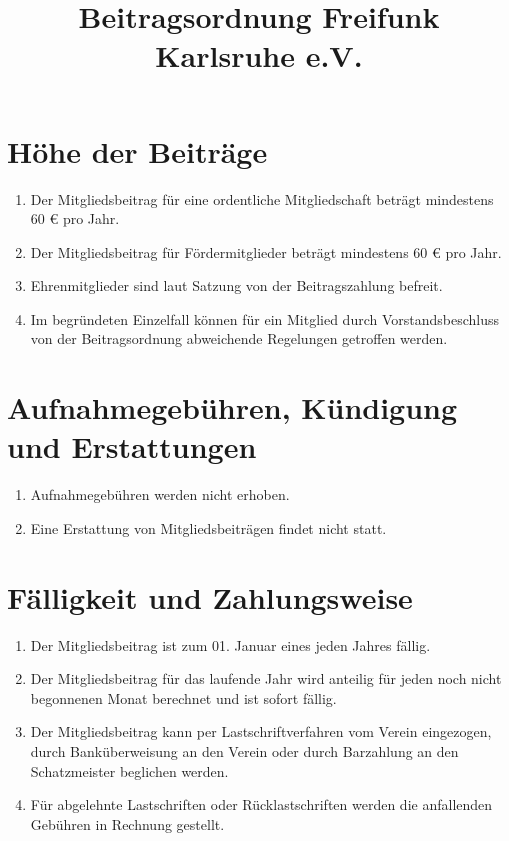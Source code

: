 \documentclass[12pt,a4paper,titlepage]{scrartcl}
\title{Beitragsordnung Freifunk Karlsruhe e.V.}
\begin{document}
\maketitle
{}
\thispagestyle{empty}
\newpage
{}
\setcounter{page}{1}

\section{Höhe der Beiträge}
\begin{enumerate}
\item Der Mitgliedsbeitrag für eine ordentliche Mitgliedschaft beträgt mindestens 60 € pro Jahr.
\item Der Mitgliedsbeitrag für Fördermitglieder beträgt mindestens 60 € pro Jahr.
\item Ehrenmitglieder sind laut Satzung von der Beitragszahlung befreit.
\item Im begründeten Einzelfall können für ein Mitglied durch Vorstandsbeschluss von der Beitragsordnung abweichende Regelungen getroffen werden.
\end{enumerate}
	
\section{Aufnahmegebühren, Kündigung und Erstattungen}
\begin{enumerate}
\item Aufnahmegebühren werden nicht erhoben.
\item Eine Erstattung von Mitgliedsbeiträgen findet nicht statt.
\end{enumerate}


\section{Fälligkeit und Zahlungsweise}
\begin{enumerate}
\item Der Mitgliedsbeitrag ist zum 01. Januar eines jeden Jahres fällig.
\item Der Mitgliedsbeitrag für das laufende Jahr wird anteilig für jeden noch nicht begonnenen Monat berechnet und ist sofort fällig.
\item Der Mitgliedsbeitrag kann per Lastschriftverfahren vom Verein eingezogen, durch Banküberweisung an den Verein oder durch Barzahlung an den Schatzmeister beglichen werden.
\item Für abgelehnte Lastschriften oder Rücklastschriften werden die anfallenden Gebühren in Rechnung gestellt.
\end{enumerate}
\end{document}
